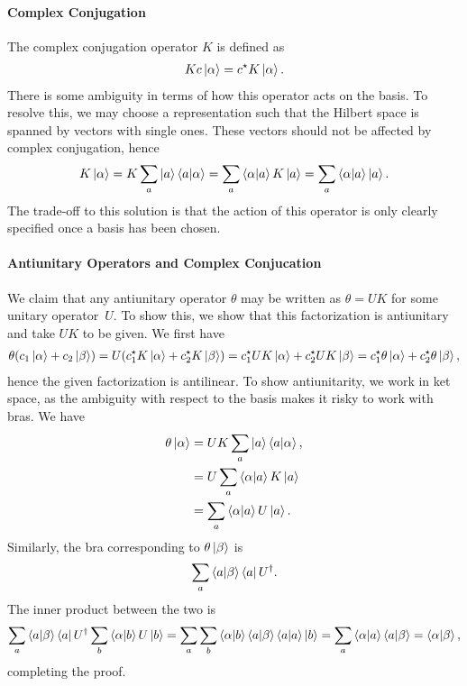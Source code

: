 \paragraph{Complex Conjugation}
The complex conjugation operator $K$ is defined as
\begin{align*}
	Kc\ket{\alpha} = c^{\star}K\ket{\alpha}.
\end{align*}
There is some ambiguity in terms of how this operator acts on the basis. To resolve this, we may choose a representation such that the Hilbert space is spanned by vectors with single ones. These vectors should not be affected by complex conjugation, hence
\begin{align*}
	K\ket{\alpha} = K\sum\limits_{a}\ket{a}\braket{a}{\alpha} = \sum\limits_{a}\braket{\alpha}{a}K\ket{a} = \sum\limits_{a}\braket{\alpha}{a}\ket{a}.
\end{align*}
The trade-off to this solution is that the action of this operator is only clearly specified once a basis has been chosen.

\paragraph{Antiunitary Operators and Complex Conjucation}
We claim that any antiunitary operator $\theta$ may be written as $\theta = UK$ for some unitary operator $U$. To show this, we show that this factorization is antiunitary and take $UK$ to be given. We first have
\begin{align*}
	\theta(c_{1}\ket{\alpha} + c_{2}\ket{\beta}) = U(c_{1}^{\star}K\ket{\alpha} + c_{2}^{\star}K\ket{\beta}) = c_{1}^{\star}UK\ket{\alpha} + c_{2}^{\star}UK\ket{\beta} = c_{1}^{\star}\theta\ket{\alpha} + c_{2}^{\star}\theta\ket{\beta},
\end{align*}
hence the given factorization is antilinear. To show antiunitarity, we work in ket space, as the ambiguity with respect to the basis makes it risky to work with bras. We have
\begin{align*}
	\theta\ket{\alpha} &= UK\sum\limits_{a}\ket{a}\braket{a}{\alpha}, \\
	                   &= U\sum\limits_{a}\braket{\alpha}{a}K\ket{a} \\
	                   &= \sum\limits_{a}\braket{\alpha}{a}U\ket{a}.
\end{align*}
Similarly, the bra corresponding to $\theta\ket{\beta}$ is
\begin{align*}
	\sum\limits_{a}\braket{a}{\beta}\bra{a}U^{\dagger}.
\end{align*}
The inner product between the two is
\begin{align*}
	\sum\limits_{a}\braket{a}{\beta}\bra{a}U^{\dagger}\sum\limits_{b}\braket{\alpha}{b}U\ket{b} = \sum\limits_{a}\sum\limits_{b}\braket{\alpha}{b}\braket{a}{\beta}\braket{a}\ket{b} = \sum\limits_{a}\braket{\alpha}{a}\braket{a}{\beta} = \braket{\alpha}{\beta},
\end{align*}
completing the proof.

